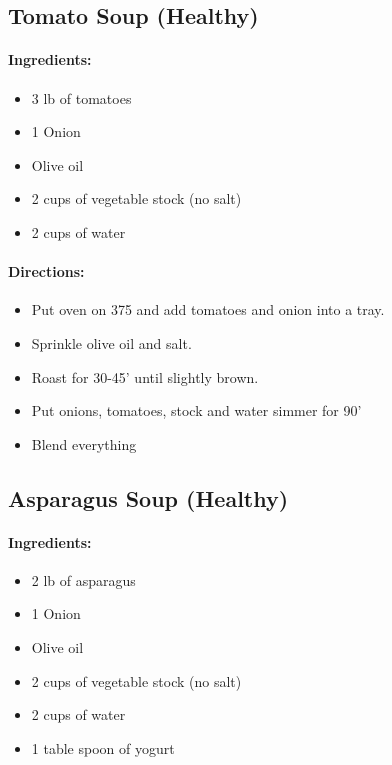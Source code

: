 \documentclass{article}
\begin{document}
\subsection{Tomato Soup (Healthy)}

\paragraph{Ingredients:}
\begin{itemize}
	\item 3 lb of tomatoes
	\item 1 Onion
	\item Olive oil
	\item 2 cups of vegetable stock (no salt)
	\item 2 cups of water
\end{itemize}

\paragraph{Directions:}
\begin{itemize}
	\item Put oven on 375 and add tomatoes and onion into a tray.
	\item Sprinkle olive oil and salt.
	\item Roast for 30-45' until slightly brown.
	\item Put onions, tomatoes, stock and water simmer for 90'
	\item Blend everything
\end{itemize}

\subsection{Asparagus Soup (Healthy)}

\paragraph{Ingredients:}
\begin{itemize}
	\item 2 lb of asparagus
	\item 1 Onion
	\item Olive oil
	\item 2 cups of vegetable stock (no salt)
	\item 2 cups of water
	\item 1 table spoon of yogurt
\end{itemize}
\end{document}

